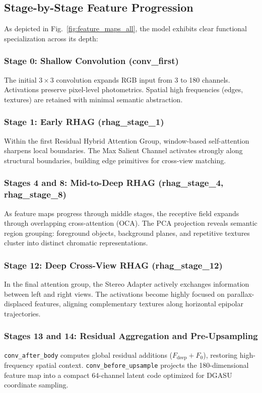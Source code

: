 \documentclass[10pt,journal,compsoc]{IEEEtran}
\begin{document}
\subsection{Stage-by-Stage Feature Progression}
As depicted in Fig.~\ref{fig:feature_maps_all}, the model exhibits clear functional specialization across its depth:

\subsubsection{Stage 0: Shallow Convolution (conv\_first)}
The initial $3 \times 3$ convolution expands RGB input from 3 to 180 channels. Activations preserve pixel-level photometrics. Spatial high frequencies (edges, textures) are retained with minimal semantic abstraction.

\subsubsection{Stage 1: Early RHAG (rhag\_stage\_1)}
Within the first Residual Hybrid Attention Group, window-based self-attention sharpens local boundaries. The Max Salient Channel activates strongly along structural boundaries, building edge primitives for cross-view matching.

\subsubsection{Stages 4 and 8: Mid-to-Deep RHAG (rhag\_stage\_4, rhag\_stage\_8)}
As feature maps progress through middle stages, the receptive field expands through overlapping cross-attention (OCA). The PCA projection reveals semantic region grouping: foreground objects, background planes, and repetitive textures cluster into distinct chromatic representations.

\subsubsection{Stage 12: Deep Cross-View RHAG (rhag\_stage\_12)}
In the final attention group, the Stereo Adapter actively exchanges information between left and right views. The activations become highly focused on parallax-displaced features, aligning complementary textures along horizontal epipolar trajectories.

\subsubsection{Stages 13 and 14: Residual Aggregation and Pre-Upsampling}
\texttt{conv\_after\_body} computes global residual additions ($F_{\text{deep}} + F_0$), restoring high-frequency spatial context. \texttt{conv\_before\_upsample} projects the 180-dimensional feature map into a compact 64-channel latent code optimized for DGASU coordinate sampling.
\end{document}
